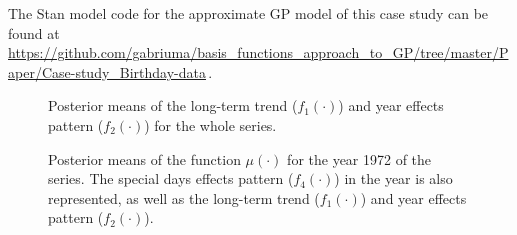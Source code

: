 \documentclass[onecolumn,a4paper,11pt]{article}
\begin{document}
The Stan model code for the approximate GP model of this case study can be found at {\small \url{https://github.com/gabriuma/basis_functions_approach_to_GP/tree/master/Paper/Case-study_Birthday-data}}\,.

\begin{figure}
\centering
{}
\caption{Posterior means of the long-term trend ($f_1(\cdot)$) and year effects pattern ($f_2(\cdot)$) for the whole series. }
  \label{ch5_fig27_posteriors_birthday}
\end{figure}

\begin{figure}
\centering
{}
\caption{Posterior means of the function $\mu(\cdot)$ for the year 1972 of the series. The special days effects pattern ($f_4(\cdot)$) in the year is also represented, as well as the long-term trend ($f_1(\cdot)$) and year effects pattern ($f_2(\cdot)$). }
  \label{ch5_fig27_posteriors_oneyear_birthday}
\end{figure}
\end{document}
